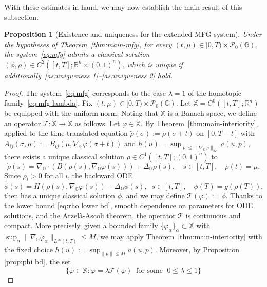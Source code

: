 \documentclass[10pt]{article}
\newtheorem{proposition}[theorem]{Proposition}
\numberwithin{equation}{section}
\newcommand{\cP}{ \mathcal{P}}
\newcommand{\R}{\mathbb R}
\def\R{{\mathbb{R}}}
\def\G{\mathbb{G}}
\begin{document}
With these estimates in hand, we may now establish the main result of this subsection.
\begin{proposition}[Existence and uniqueness for the extended MFG system]\label{prop:mfg-classical}
Under the hypotheses of Theorem~\ref{thm:main-mfg}, for every $(t,\mu)\in[0,T)\times\cP_0(\G)$, the system~\eqref{eq:mfg} admits a classical solution $(\phi,\rho)\in C^2([t,T];\R^n\times(0,1)^n)$, which is unique if additionally~\eqref{as:uniqueness 1}--\eqref{as:uniqueness 2} hold.
\end{proposition}
\begin{proof}
The system~\eqref{eq:mfg} corresponds to the case $\lambda=1$ of the homotopic family~\eqref{eq:mfg lambda}.
Fix $(t,\mu)\in[0,T)\times\cP_0(\G)$. Let $\mathbb X=C^0([t, T] ; \R^n)$ be equipped with the uniform norm. Noting that $\mathbb X$ is a Banach space, we define an operator $\mathcal T : \mathbb X \to \mathbb X$ as follows. Let $\varphi \in \mathbb X$. By Theorem~\ref{thm:main-interiority}, applied to the time-translated equation $\tilde\rho(\sigma):=\rho(\sigma+t)$ on $[0,T-t]$ with $A_{ij}(\sigma,\mu):=B_{ij}(\mu,\nabla_{\G}\varphi(\sigma+t))$ and $h(u)=\sup_{|p|\leq \|\nabla_{\G}\varphi\|_{\infty}}a(u,p)$, there exists a unique classical solution $\rho \in C^1([t, T];(0,1)^n)$ to
\begin{equation}\label{eq:conti fix pf}
    \dot \rho(s)= \nabla_{\G}\cdot(B(\rho(s),\nabla_{\G}\varphi(s)))+\Delta_{\G}\rho(s), \quad s\in [t,T],\quad \rho(t)=\mu.
\end{equation}
Since $\rho_i>0$ for all $i$, the backward ODE
\begin{equation}
    \dot \phi(s)=H(\rho(s),\nabla_{\G}\varphi(s))-\Delta_{\G}\phi(s), \;\; s\in [t,T], \quad \phi(T)=g(\rho(T)),
\end{equation}
then has a unique classical solution $\phi$, and we may define $\mathcal T(\varphi):=\phi$. Thanks to the lower bound \eqref{eq:rho lower bd}, smooth dependence on parameters for ODE solutions, and the Arzel\`a-Ascoli theorem, the operator $\mathcal T$ is continuous and compact. More precisely, given a bounded family $\{\varphi_{\alpha}\}_{\alpha}\subset \mathbb X$ with $\sup_{\alpha}\|\nabla_{\G}\varphi_{\alpha}\|_{L^{\infty}(t,T)}\leq M$, we may apply Theorem~\ref{thm:main-interiority} with the fixed choice $h(u):=\sup_{\|p\|\leq M}a(u,p)$.   Moreover, by Proposition \ref{prop:phi bd}, the set
\begin{equation}
    \{\varphi\in \mathbb X: \varphi=\lambda \mathcal T(\varphi) \;\;\text{for some } \;0\leq\lambda\leq 1\}

\end{equation}
\end{proof}
\end{document}
